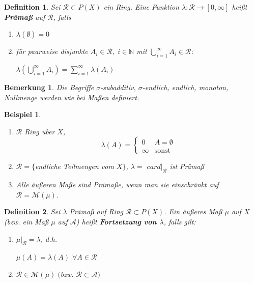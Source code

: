 \documentclass[11pt]{memoir}
\theoremstyle{changebreak}
\newtheorem{Definition}{Definition}[chapter]
\newtheorem{Bemerkung}{Bemerkung}[chapter]
\newtheorem{Beispiel}{Beispiel}[chapter]
\begin{document}
\begin{Definition}
Sei $\mathscr R \subset P(X)$ ein Ring. Eine Funktion $\lambda: \mathscr R \rightarrow [0, \infty]$ heißt \textbf{Prämaß} auf $\mathscr R$, falls
\begin{enumerate}
	\item $\lambda(\emptyset) = 0$
	\item für paarweise disjunkte $A_i \in \mathscr R, \; i \in \mathbb N$ mit $\bigcup\limits_{i=1}^\infty A_i \in \mathscr R$: 
	\begin{center}
		$\lambda \left(\bigcup\limits_{i=1}^\infty A_i\right) = \sum\limits_{i=1}^\infty \lambda(A_i)$
	\end{center}
\end{enumerate}
\end{Definition}

\begin{Bemerkung}
Die Begriffe $\sigma$-subadditiv, $\sigma$-endlich, endlich, monoton, Nullmenge werden wie bei Maßen definiert.
\end{Bemerkung}

\begin{Beispiel}
\begin{enumerate}
	\item $\mathscr R$ Ring über $X$,
	\begin{equation}
	\lambda(A) =
		\begin{cases}
			0 & A = \emptyset \\
			\infty & \text{sonst}
		\end{cases}
	\end{equation}
	\item $\mathscr R = \{$endliche Teilmengen vom $X\}$, $\lambda = $ $card|_{\mathscr R}$ ist Prämaß
	\item Alle äußeren Maße sind Prämaße, wenn man sie einschränkt auf $\mathscr R = \mathscr M(\mu)$.
\end{enumerate}
\end{Beispiel}

\begin{Definition}
Sei $\lambda$ Prämaß auf Ring $\mathscr R \subset P(X)$. Ein äußeres Maß $\mu$ auf $X$ (bzw. ein Maß $\mu$ auf $\mathscr A$) heißt \textbf{Fortsetzung von $\lambda$}, falls gilt:
\begin{enumerate}
	\item $\mu|_\mathscr R = \lambda$, d.h. 
	\begin{center}
		$\mu(A) = \lambda(A)$ $\forall A \in \mathscr R$
	\end{center}
	\item $\mathscr R \in \mathscr M(\mu) \; ($bzw. $\mathscr R \subset \mathscr A)$
\end{enumerate}
\end{Definition}
\end{document}
